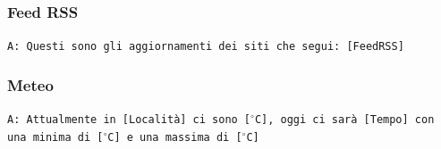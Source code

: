 \subsubsection{Feed RSS}
\texttt{A: Questi sono gli aggiornamenti dei siti che segui: [FeedRSS]}

\subsubsection{Meteo}
\texttt{A: Attualmente in [Località] ci sono [$^\circ$C], oggi ci sarà [Tempo] con una minima di [$^\circ$C] e una massima di [$^\circ$C]}

